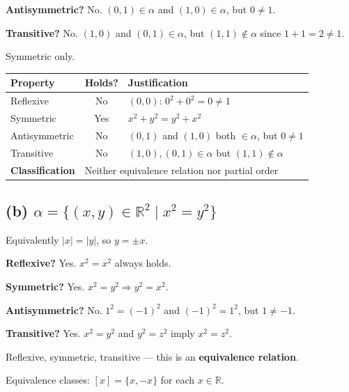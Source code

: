 \documentclass[12pt, a4paper]{article}
\newcommand{\R}{\mathbb{R}}
\begin{document}
\textbf{Antisymmetric?} No.  $(0, 1) \in \alpha$ and $(1, 0) \in \alpha$, but $0 \ne 1$.

\textbf{Transitive?} No.  $(1, 0)$ and $(0, 1) \in \alpha$, but $(1, 1) \notin \alpha$ since $1 + 1 = 2 \ne 1$.

\begin{answerbox}
Symmetric only.
\end{answerbox}

\begin{center}
\renewcommand{\arraystretch}{1.15}
\begin{tabular}{l|c|l}
  \toprule
  \textbf{Property} & \textbf{Holds?} & \textbf{Justification} \\
  \midrule
  Reflexive      & No  & $(0,0)$: $0^2+0^2=0\ne1$ \\
  Symmetric      & Yes & $x^2+y^2 = y^2+x^2$ \\
  Antisymmetric  & No  & $(0,1)$ and $(1,0)$ both $\in\alpha$, but $0\ne1$ \\
  Transitive     & No  & $(1,0),(0,1)\in\alpha$ but $(1,1)\notin\alpha$ \\
  \midrule
  \textbf{Classification} & \multicolumn{2}{l}{Neither equivalence relation nor partial order} \\
  \bottomrule
\end{tabular}
\end{center}

\subsection*{(b)\; $\alpha = \{(x,y) \in \R^2 \mid x^2 = y^2\}$}

Equivalently $|x| = |y|$, so $y = \pm x$.

\textbf{Reflexive?} Yes.  $x^2 = x^2$ always holds. \checkmark

\textbf{Symmetric?} Yes.  $x^2 = y^2 \Rightarrow y^2 = x^2$. \checkmark

\textbf{Antisymmetric?} No.  $1^2 = (-1)^2$ and $(-1)^2 = 1^2$, but $1 \ne -1$.

\textbf{Transitive?} Yes.  $x^2 = y^2$ and $y^2 = z^2$ imply $x^2 = z^2$. \checkmark

\begin{answerbox}
Reflexive, symmetric, transitive --- this is an \textbf{equivalence relation}.

Equivalence classes: $[x] = \{x, -x\}$ for each $x \in \R$.
\end{answerbox}
\end{document}
